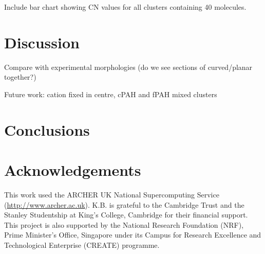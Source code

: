 Include bar chart showing CN values for all clusters containing 40 molecules.




\section{Discussion}
Compare with experimental morphologies (do we see sections of curved/planar together?)

Future work: cation fixed in centre, cPAH and fPAH mixed clusters

\section{Conclusions}


\section*{Acknowledgements}
This work used the ARCHER UK National Supercomputing Service (\url{http://www.archer.ac.uk}).
K.B. is grateful to the Cambridge Trust and the Stanley Studentship at King's College, Cambridge for their financial support.
This project is also supported by the National Research Foundation (NRF), Prime Minister's Office, Singapore under its Campus for Research Excellence and Technological Enterprise (CREATE) programme.
